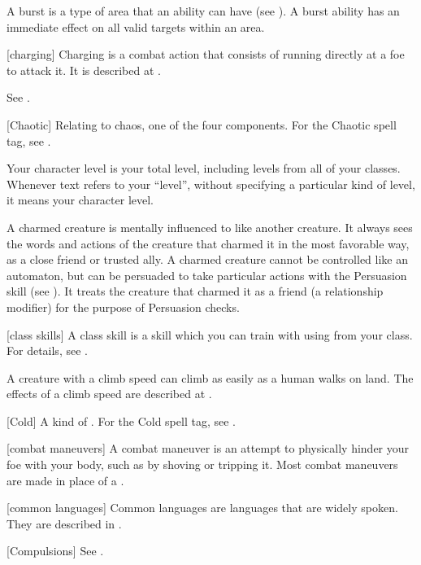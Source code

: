  A burst is a type of area that an ability can have (see ).
A burst ability has an immediate effect on all valid targets within an area.

[charging] Charging is a combat action that consists of running directly at a foe to attack it.
It is described at .

 See .

[Chaotic] Relating to chaos, one of the four  components. For the Chaotic spell tag, see .

 Your character level is your total level, including levels from all of your classes.
Whenever text refers to your ``level'', without specifying a particular kind of level, it means your character level.

 A charmed creature is mentally influenced to like another creature.
It always sees the words and actions of the creature that charmed it in the most favorable way, as a close friend or trusted ally.
A charmed creature cannot be controlled like an automaton, but can be persuaded to take particular actions with the Persuasion skill (see ).
It treats the creature that charmed it as a friend (a  relationship modifier) for the purpose of Persuasion checks.

[class skills] A class skill is a skill which you can train with using  from your class. For details, see .

 A creature with a climb speed can climb as easily as a human walks on land.
The effects of a climb speed are described at .

[Cold] A kind of . For the Cold spell tag, see .

[combat maneuvers] A combat maneuver is an attempt to physically hinder your foe with your body, such as by shoving or tripping it.
Most combat maneuvers are made in place of a .

[common languages] Common languages are languages that are widely spoken.
They are described in .

[Compulsions] See .

